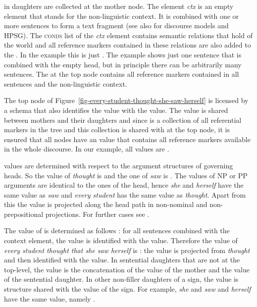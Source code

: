 \documentclass[output=paper
 	        ,biblatex
                ,babelshorthands
                ,newtxmath
                ,draftmode
                ,colorlinks, citecolor=brown
]{langscibook}
\begin{document}
in daughters are collected at the mother node. The element \emph{ctx} is an empty element that
stands for the non-linguistic context. It is combined with one or more sentences to form a text
fragment (see also  for discourse models and HPSG). The \textsc{conds}
list of the \emph{ctx} element contains semantic relations that hold of the world and all reference
markers contained in these relations are also added to the \listlul. In the example this is just
. The example shows just one sentence that is combined with the empty head, but in principle
there can be arbitrarily many sentences. The \listlul at the top node contains all reference markers contained in
all sentences and the non-linguistic context. 

The top node of Figure~\ref{fig-every-student-thought-she-saw-herself} is licensed by a schema that
also identifies the \listu value with the \listlu value. The \listu value is shared between mothers
and their daughters and since \listlu is a collection of all referential markers in the tree and
this collection is shared with \listu at the top node, it is ensured that all nodes have an \listu
value that contains all reference markers available in the whole discourse. In our example, all
\listu values are .

\lista values are determined with respect to the argument structures of governing heads. So the
\lista value of \emph{thought} is  and the one of \emph{saw} is
. The \lista values of NP or PP arguments are identical to the ones of the head,
hence \emph{she} and \emph{herself} have the same \lista value as \emph{saw} and \emph{every
  student} has the same \lista value as \emph{thought}. Apart from this the \lista value is
projected along the head path in non-nominal and non-prepositional projections. For further cases
see \citet[]{Branco2002a}.

The value of \listz is determined as follows \citep[]{Branco2002a}: for all sentences combined with the context element,
the \listz value is identified with the \lista value. Therefore the \listz value of \emph{every
  student thought that she saw herself} is : the \lista value is
projected from \emph{thought} and then identified with the \listz value. In sentential daughters
that are not at the top-level, the \listz value is the concatenation of the \listz value of the
mother and the \lista value of the sentential daughter. In other non-filler daughters of a sign, the
\listz value is structure shared with the \listz value of the sign. For example, \emph{she} and
\emph{saw} and \emph{herself} have the same \listz value, namely .
\end{document}
